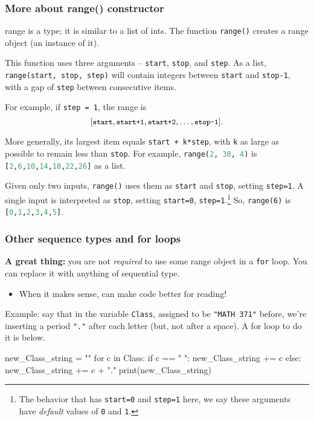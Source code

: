 \documentclass{beamer}
\newenvironment{codeblock}
    {\hfill\begin{beamerboxesrounded}[lower=codecol, width=0.8\textwidth]
    \medskip

    }
    { 
    \end{beamerboxesrounded}\hfill
    }
\theoremstyle{example}
\newcommand{\ct}[1]{\lstinline[language=Python]!#1!}
\newcommand{\ttt}[1]{{\small\texttt{#1}}}
\begin{document}
\begin{frame}[fragile]
\frametitle{More about {\ttm range()} constructor}
{\ttb range} is a type; it is similar to a list of ints. The function \ttt{range()} creates a range object (an instance of it). 

This function uses three arguments {--} \ttt{start}, \ttt{stop}, and \ttt{step}. %
As a list, \ttt{range(start, stop, step)} will contain integers between \ttt{start} and \ttt{stop-1}, with a gap of \ttt{step} between consecutive items. 

For example, if \ttt{step = 1}, the range is 
\[ [\ttt{start}, \ttt{start+1},\ttt{start+2},\ldots,\ttt{stop-1}]. \]

More generally, its largest item equals \ttt{start + k*step}, with \ttt{k} as large as possible to remain less than \ttt{stop}. For example, \ttt{range(}\ct{2, 30, 4}\ttt{)} is \ct{[2,6,10,14,18,22,26]} as a list.

Given only two inputs, \ttt{range()} uses them as \ttt{start} and \ttt{stop}, setting \ttt{step=1}. A single input is interpreted as \ttt{stop}, setting \ttt{start=0}, \ttt{step=1}.\footnote{The behavior that has \ttt{start=0} and \ttt{step=1} here, we say these arguments have \emph{default} values of \ttt{0} and \ttt{1}.} So, \ttt{range(6)} is \ct{[0,1,2,3,4,5]}.
\end{frame}

\begin{frame}[fragile]
\frametitle{Other sequence types and for loops}
\textbf{A great thing:} you are not \emph{required} to use some range object in a \ttt{for} loop. You can replace it with anything of sequential type. 
\begin{itemize}
	\item When it makes sense, can make code better for reading!
\end{itemize}

\vfill
Example: say that in the variable \ttt{Class}, assigned to be \ttt{"MATH 371"} before, we're inserting a period \ttt{"."} after each letter (but, not after a space). A for loop to do it is below.
\vspace*{12pt}

\begin{codeblock}

\begin{python}
new_Class_string = ""
for c in Class:
    if c == " ":
        new_Class_string += c
    else:
        new_Class_string += c + "."
print(new_Class_string)
\end{python}

\end{codeblock}
\end{frame}
\end{document}
